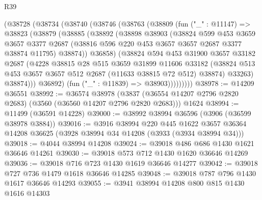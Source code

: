 \begin{lexlean}{R39}
\begin{coremodule}
        (@38728
          (@38734
            (@38740
              (@38746
                (@38763
                  (@38809
                    (fun ("_" : @11147) =>
                    @38823
                      (@38879
                        (@38885
                          (@38892
                            (@38898
                              @38903
                              (@38824
                                @599
                                @453
                                @3659
                                @3657
                                @3377
                                @2687
                                (@38816 @596 @220 @453 @3657 @3657 @2687 @3377 @38874 @11795)
                                @38874))
                            @36858)
                          (@38824
                            @594
                            @453
                            @31900
                            @3657
                            @33182
                            @2687
                            (@4228
                              @38815
                              @28
                              @515
                              @3659
                              @31899
                              @11606
                              @33182
                              (@38824
                                @513
                                @453
                                @3657
                                @3657
                                @512
                                @2687
                                (@11633 @38815 @72 @512)
                                @38874)
                              @33263)
                            @38874)))
                      @36892)
                    (fun ("_" : @11839) => @38903)))))))))
@38978 := @14209 @36551
@38992 := @36574
    @38978
    (@3837 (@36554 @14207 @2796 @2820 @2683) (@3560 (@36560 @14207 @2796 @2820 @2683)))
    @1624
@38994 := @11499 (@36591 @14228)
@39000 := @38992 @38994 @36596 (@3906 (@36599 @38978 @3884))
@39016 := @3916
    @38994
    @220
    @445
    @1622
    @3657
    @36364
    @14208
    @36625
    (@3928 @38994 @34 @14208 (@3933 (@3934 @38994 @34)))
@39018 := @4044 @38994 @14208
@39024 := @39018 @486 @686 @1430 @1621 @36646 @14261
@39030 := @39018 @573 @712 @1430 @1620 @36646 @14269
@39036 := @39018 @716 @723 @1430 @1619 @36646 @14277
@39042 := @39018 @727 @736 @1479 @1618 @36646 @14285
@39048 := @39018 @787 @796 @1430 @1617 @36646 @14293
@39055 := @3941 @38994 @14208 @800 @815 @1430 @1616 @14303

\end{coremodule}
\end{lexlean}
